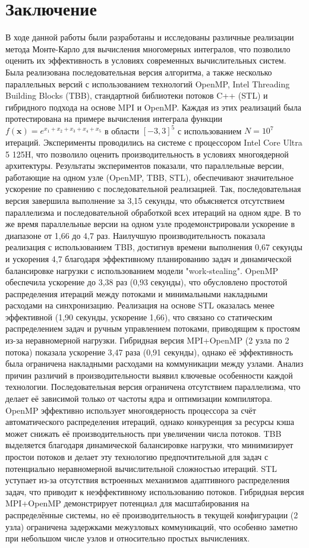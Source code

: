 \documentclass[12pt,a4paper]{extarticle}
\begin{document}
\newpage
\section{Заключение}
В ходе данной работы были разработаны и исследованы различные реализации метода Монте-Карло для вычисления многомерных интегралов, что позволило оценить их эффективность в условиях современных вычислительных систем. Была реализована последовательная версия алгоритма, а также несколько параллельных версий с использованием технологий OpenMP, Intel Threading Building Blocks (TBB), стандартной библиотеки потоков C++ (STL) и гибридного подхода на основе MPI и OpenMP. Каждая из этих реализаций была протестирована на примере вычисления интеграла функции $f(\mathbf{x}) = e^{x_1 + x_2 + x_3 + x_4 + x_5}$ в области $[-3, 3]^5$ с использованием $N = 10^7$ итераций. Эксперименты проводились на системе с процессором Intel Core Ultra 5 125H, что позволило оценить производительность в условиях многоядерной архитектуры.
Результаты экспериментов показали, что параллельные версии, работающие на одном узле (OpenMP, TBB, STL), обеспечивают значительное ускорение по сравнению с последовательной реализацией. Так, последовательная версия завершила выполнение за 3,15 секунды, что объясняется отсутствием параллелизма и последовательной обработкой всех итераций на одном ядре. В то же время параллельные версии на одном узле продемонстрировали ускорение в диапазоне от 1,66 до 4,7 раз. Наилучшую производительность показала реализация с использованием TBB, достигнув времени выполнения 0,67 секунды и ускорения 4,7 благодаря эффективному планированию задач и динамической балансировке нагрузки с использованием модели "work-stealing". OpenMP обеспечила ускорение до 3,38 раз (0,93 секунды), что обусловлено простотой распределения итераций между потоками и минимальными накладными расходами на синхронизацию. Реализация на основе STL оказалась менее эффективной (1,90 секунды, ускорение 1,66), что связано со статическим распределением задач и ручным управлением потоками, приводящим к простоям из-за неравномерной нагрузки. Гибридная версия MPI+OpenMP (2 узла по 2 потока) показала ускорение 3,47 раза (0,91 секунды), однако её эффективность была ограничена накладными расходами на коммуникации между узлами.
Анализ причин различий в производительности выявил ключевые особенности каждой технологии. Последовательная версия ограничена отсутствием параллелизма, что делает её зависимой только от частоты ядра и оптимизации компилятора. OpenMP эффективно использует многоядерность процессора за счёт автоматического распределения итераций, однако конкуренция за ресурсы кэша может снижать её производительность при увеличении числа потоков. TBB выделяется благодаря динамической балансировке нагрузки, что минимизирует простои потоков и делает эту технологию предпочтительной для задач с потенциально неравномерной вычислительной сложностью итераций. STL уступает из-за отсутствия встроенных механизмов адаптивного распределения задач, что приводит к неэффективному использованию потоков. Гибридная версия MPI+OpenMP демонстрирует потенциал для масштабирования на распределённые системы, но её производительность в текущей конфигурации (2 узла) ограничена задержками межузловых коммуникаций, что особенно заметно при небольшом числе узлов и относительно простых вычислениях.
\end{document}
